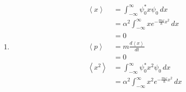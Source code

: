 \documentclass{article}
\newcommand{\ev}[1]{\left< #1 \right>}
\begin{document}
\subsection{}

\begin{enumerate}
  \item

        \begin{align*}
          \ev{x}   & = \int_{-\infty}^\infty \psi_0^* x \psi_0 \,d x                                                                                                                                                                                                                  \\
                   & = \alpha^2 \int_{-\infty}^\infty x e^{-\frac{m \omega}{\hbar} x^2} \,d x                                                                                                                                                                                         \\
                   & = 0                                                                                                                                                                                                                                                              \\
          \ev{p}   & = m \frac{d \ev{x}}{d t}                                                                                                                                                                                                                                         \\
                   & = 0                                                                                                                                                                                                                                                              \\
          \ev{x^2} & = \int_{-\infty}^\infty \psi_0^* x^2 \psi_0 \,d x                                                                                                                                                                                                                \\
                   & = \alpha^2 \int_{-\infty}^\infty x^2 e^{-\frac{m \omega}{\hbar} x^2} \,d x                                                                                                                                                                                       \\

\end{align*}
\end{enumerate}
\end{document}
